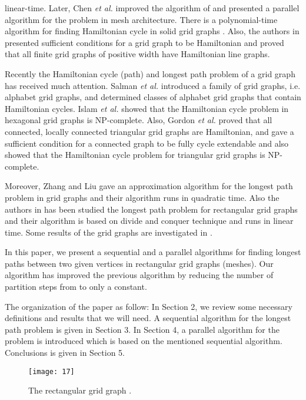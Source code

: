 \documentclass[preprint,12pt]{elsarticle}
\begin{document}
linear-time. Later, Chen \textit{et al.} \cite{CST:AFAFCHPIM}
improved the algorithm of \cite{IPS:HPIGG} and presented a parallel
algorithm for the problem in mesh architecture. There is a
polynomial-time algorithm for finding Hamiltonian cycle in solid
grid graphs \cite{LU:HCISGG}. Also, the authors in \cite{CT:HPOGG}
presented sufficient conditions for a grid graph to be Hamiltonian
and proved that all finite grid graphs of positive width have
Hamiltonian line graphs.\par Recently the Hamiltonian cycle (path)
and longest path problem of a grid graph has received much
attention. Salman \textit{et al.} \cite{AEB:SSAG} introduced a
family of grid graphs, i.e. alphabet grid graphs, and determined
classes of alphabet grid graphs that contain Hamiltonian cycles.
Islam \textit{et al.} \cite{Imnrx:hcihgg} showed that the
Hamiltonian cycle problem in hexagonal grid graphs is NP-complete.
Also, Gordon \textit{et al.} \cite{vyf:hpotgg} proved that all
connected, locally connected triangular grid graphs are Hamiltonian,
and gave a sufficient condition for a connected graph to be fully
cycle extendable and also showed that the Hamiltonian cycle problem
for triangular grid graphs is NP-complete.\par Moreover, Zhang and
Liu \cite{wqz} gave an approximation algorithm for the longest path
problem in grid graphs and their algorithm runs in quadratic time.
Also the authors in \cite{FAA:ALAFFLPIRGG} has been studied the
longest path problem for rectangular grid graphs and their algorithm
is based on divide and conquer technique and runs in linear time.
Some results of the grid graphs are investigated in
\cite{kb:hpiscogg, 6}. \par In this paper, we present a sequential
and a parallel algorithms for finding longest paths between two
given vertices in rectangular grid graphs (meshes). Our algorithm
has improved the previous algorithm \cite{FAA:ALAFFLPIRGG} by
reducing the number of partition steps from  to only a
constant.
\par The organization of the paper as follow: In Section 2, we review some necessary definitions
and results that we will need. A sequential algorithm for the
longest path problem is given in Section 3. In Section 4, a parallel
algorithm for the problem is introduced which is based on the
mentioned sequential algorithm. Conclusions is given in Section 5.
\begin{figure}[tb]
  \centering
  \texttt{[image: 17]}
  \caption[]{\small The rectangular grid graph .}
\label{bb}
\end{figure}
\end{document}
